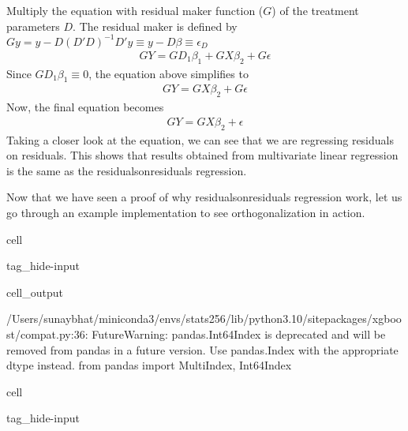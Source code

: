 \documentclass[letterpaper,10pt,english]{jupyterBook}
\begin{document}
\sphinxAtStartPar
Multiply the equation with residual maker function (\(G\)) of the treatment parameters \(D\). The residual maker is defined by \(Gy = y - D(D'D)^{-1}D'y \equiv y - D\beta \equiv \epsilon_D\)
\begin{equation*}
\begin{split} GY = GD_1\beta_1 + GX\beta_2 + G\epsilon \end{split}
\end{equation*}
\sphinxAtStartPar
Since \(GD_1\beta_1 \equiv 0\), the equation above simplifies to
\begin{equation*}
\begin{split} GY = GX\beta_2 + G\epsilon \end{split}
\end{equation*}
\sphinxAtStartPar
Now, the final equation becomes
\begin{equation*}
\begin{split} GY = GX\beta_2 + \epsilon \end{split}
\end{equation*}
\sphinxAtStartPar
Taking a closer look at the equation, we can see that we are regressing residuals on residuals. This shows that results obtained from multivariate linear regression is the same as the residuals\sphinxhyphen{}on\sphinxhyphen{}residuals regression.

\sphinxAtStartPar
Now that we have seen a proof of why residuals\sphinxhyphen{}on\sphinxhyphen{}residuals regression work, let us go through an example implementation to see orthogonalization in action.

\begin{sphinxuseclass}{cell}
\begin{sphinxuseclass}{tag_hide-input}\begin{sphinxVerbatimOutput}

\begin{sphinxuseclass}{cell_output}
\begin{sphinxVerbatim}[commandchars=\\\{\}]
/Users/sunaybhat/miniconda3/envs/stats256/lib/python3.10/site\PYGZhy{}packages/xgboost/compat.py:36: FutureWarning: pandas.Int64Index is deprecated and will be removed from pandas in a future version. Use pandas.Index with the appropriate dtype instead.
  from pandas import MultiIndex, Int64Index
\end{sphinxVerbatim}

\end{sphinxuseclass}\end{sphinxVerbatimOutput}

\end{sphinxuseclass}
\end{sphinxuseclass}
\begin{sphinxuseclass}{cell}
\begin{sphinxuseclass}{tag_hide-input}
\end{sphinxuseclass}
\end{sphinxuseclass}
\end{document}
